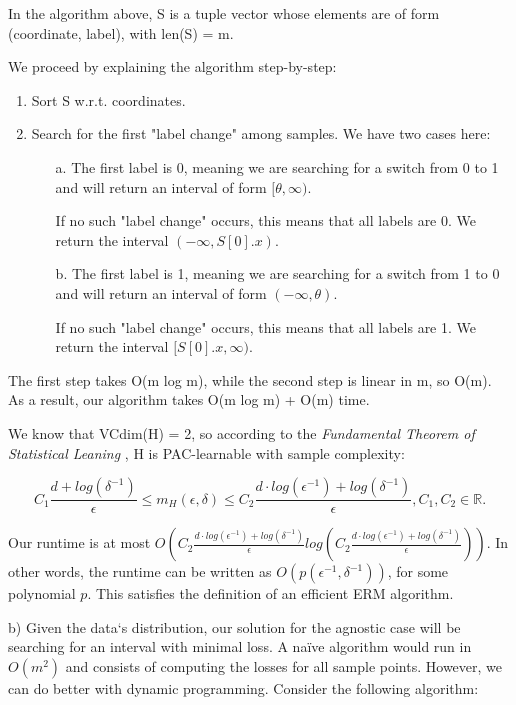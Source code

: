 \documentclass{article}
\newcommand{\<}{\langle}
\renewcommand{\>}{\rangle}
\theoremstyle{definition}
\begin{document}
In the algorithm above, S is a tuple vector whose elements are of form (coordinate, label), with len(S) = m. 

We proceed by explaining the algorithm step-by-step:

\begin{enumerate}
    \item Sort S w.r.t. coordinates.
    \item Search for the first "label change" among samples. We have two cases here:
    \begin{enumerate}
        \item[a.] The first label is 0, meaning we are searching for a switch from 0 to 1 and will return an interval of form $[\theta, \infty)$. 
        
        If no such "label change" occurs, this means that all labels are 0. We return the interval $(-\infty, S[0].x)$.
        
        \item[b.] The first label is 1, meaning we are searching for a switch from 1 to 0 and will return an interval of form $(-\infty, \theta)$.
        
        If no such "label change" occurs, this means that all labels are 1. We return the interval $[S[0].x, \infty)$.
    \end{enumerate}
\end{enumerate}

The first step takes O(m log m), while the second step is linear in m, so O(m). As a result, our algorithm takes O(m log m) + O(m) time. 

We know that VCdim(H) = 2, so according to the \textit{Fundamental Theorem of Statistical Leaning} \cite{SS}, H is PAC-learnable with sample complexity:

$$C_1\frac{d+ log(\delta^{-1})}{\epsilon} \leq m_H(\epsilon, \delta) \leq C_2 \frac{d \cdot log(\epsilon^{-1})+log(\delta^{-1})}{\epsilon}, C_1, C_2 \in \mathbb{R}.$$

Our runtime is at most $O(C_2 \frac{d \cdot log(\epsilon^{-1})+log(\delta^{-1})}{\epsilon} log(C_2 \frac{d \cdot log(\epsilon^{-1})+log(\delta^{-1})}{\epsilon}))$. In other words, the runtime can be written as $O(p(\epsilon^{-1}, \delta^{-1}))$, for some polynomial $p$. This satisfies the definition of an efficient ERM algorithm.

\vspace{1mm}

b) Given the data`s distribution, our solution for the agnostic case will be searching for an interval with minimal loss. A naïve algorithm would run in $O(m^2)$ and consists of computing the losses for all sample points. However, we can do better with dynamic programming. Consider the following algorithm:
\end{document}
